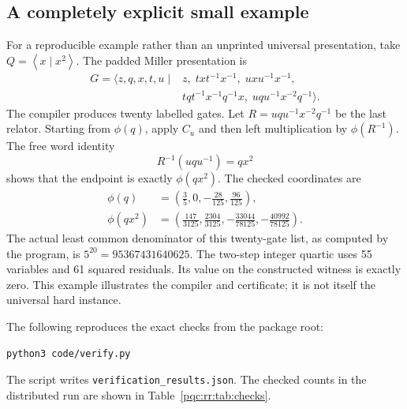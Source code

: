 \documentclass[11pt,letterpaper]{article}
\numberwithin{equation}{section}
\theoremstyle{definition}
\theoremstyle{remark}
\newcommand{\code}[1]{\nolinkurl{#1}}
\newcommand{\pair}[1]{\left\langle #1\right\rangle}
\begin{document}
\subsection{A completely explicit small example}

For a reproducible example rather than an unprinted universal
presentation, take $Q=\pair{x\mid x^2}$. The padded Miller presentation is
\begin{equation}\label{pqc:rr:eq:toy}
\begin{split}
G=\langle z,q,x,t,u\mid {}&z,\;txt^{-1}x^{-1},\;uxu^{-1}x^{-1},\\
 &tqt^{-1}x^{-1}q^{-1}x,\;
 uqu^{-1}x^{-2}q^{-1}\rangle.
\end{split}
\end{equation}
The compiler produces twenty labelled gates. Let
$R=uqu^{-1}x^{-2}q^{-1}$ be the last relator. Starting from $\phi(q)$,
apply $C_u$ and then left multiplication by $\phi(R^{-1})$. The free
word identity
\[
 R^{-1}(uqu^{-1})=qx^2
\]
shows that the endpoint is exactly $\phi(qx^2)$. The checked coordinates
are
\begin{align*}
 \phi(q)&=\left(\frac35,0,-\frac{28}{125},\frac{96}{125}\right),\\
 \phi(qx^2)&=\left(\frac{147}{3125},\frac{2304}{3125},
                   -\frac{33044}{78125},-\frac{40992}{78125}\right).
\end{align*}
The actual least common denominator of this twenty-gate list, as
computed by the program, is $5^{20}=95367431640625$. The two-step
integer quartic uses 55 variables and 61 squared residuals. Its value
on the constructed witness is exactly zero. This example illustrates the
compiler and certificate; it is not itself the universal hard instance.

The following reproduces the exact checks from the package root:
\begin{lstlisting}
python3 code/verify.py
\end{lstlisting}
The script writes \code{verification_results.json}. The checked counts
in the distributed run are shown in Table~\ref{pqc:rr:tab:checks}.
\end{document}
